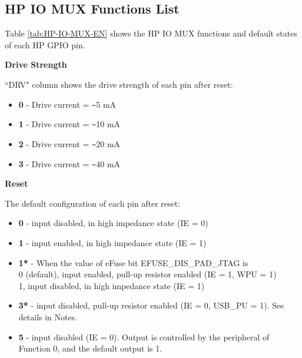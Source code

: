 \documentclass[main\_\_EN.tex]{subfiles}
\begin{document}
\begin{landscape}



\tableheaderLPSignalEN
\tablecontentLPSignal

\section{HP IO MUX Functions List}
\label{sec:hp_iomux_pads}
Table \ref{tab:HP-IO-MUX-EN} shows the HP IO MUX functions and default states of each HP GPIO pin.


\tableheaderHPFunctionsEN
\tablecontentHPFunctions

\end{landscape}

\textbf{Drive Strength}

``DRV" column shows the drive strength of each pin after reset:

\begin{itemize}
\item \textbf{0} - Drive current = \verb+~+5 mA
\item \textbf{1} - Drive current = \verb+~+10 mA
\item \textbf{2} - Drive current = \verb+~+20 mA
\item \textbf{3} - Drive current = \verb+~+40 mA
\end{itemize}

    \textbf{Reset}

    The default configuration of each pin after reset:

    \begin{itemize}
        \item \textbf{0} - input disabled, in high impedance state (IE = 0)
        \item \textbf{1} - input enabled, in high impedance state (IE = 1)
        \item \textbf{1*} - When the value of eFuse bit EFUSE\_DIS\_PAD\_JTAG is
        \\\hspace{1.9 em}0 (default), input enabled, pull-up resistor enabled (IE = 1, WPU = 1)
        \\\hspace{1.9 em}1, input disabled, in high impedance state (IE = 1)
        \item \textbf{3*} - input disabled, pull-up resistor enabled (IE = 0, USB\_PU = 1). See details in Notes.
        \item \textbf{5} - input disabled (IE = 0). Output is controlled by the peripheral of Function 0, and the default output is 1.
    \end{itemize}
\end{document}
